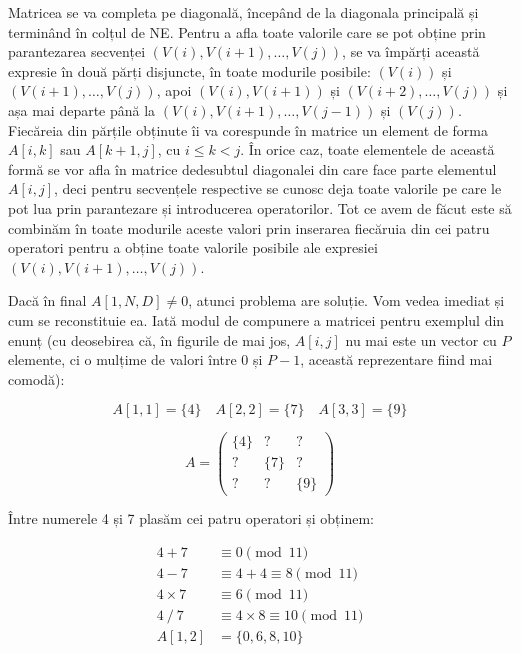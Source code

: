 Matricea se va completa pe diagonală, începând de la diagonala principală și
terminând în colțul de NE. Pentru a afla toate valorile care se pot obține
prin parantezarea secvenței $(V(i), V(i+1), \dots, V(j))$, se va împărți
această expresie în două părți disjuncte, în toate modurile posibile: $(V(i))$
și $(V(i+1), \dots, V(j))$, apoi $(V(i), V(i+1))$ și $(V(i+2), \dots, V(j))$
și așa mai departe până la $(V(i), V(i+1), \dots, V(j-1))$ și
$(V(j))$. Fiecăreia din părțile obținute îi va corespunde în matrice un
element de forma $A[i,k]$ sau $A[k+1,j]$, cu $i \leq k < j$. În orice caz,
toate elementele de această formă se vor afla în matrice dedesubtul diagonalei
din care face parte elementul $A[i,j]$, deci pentru secvențele respective se
cunosc deja toate valorile pe care le pot lua prin parantezare și introducerea
operatorilor. Tot ce avem de făcut este să combinăm în toate modurile aceste
valori prin inserarea fiecăruia din cei patru operatori pentru a obține toate
valorile posibile ale expresiei $(V(i), V(i+1), \dots, V(j))$.

Dacă în final $A[1,N,D] \neq 0$, atunci problema are soluție. Vom vedea
imediat și cum se reconstituie ea. Iată modul de compunere a matricei pentru
exemplul din enunț (cu deosebirea că, în figurile de mai jos, $A[i,j]$ nu mai
este un vector cu $P$ elemente, ci o mulțime de valori între 0 și $P-1$,
această reprezentare fiind mai comodă):

\begin{equation}
  A[1,1] = \{4\} \quad A[2,2] = \{7\} \quad A[3,3] = \{9\}
\end{equation}

\begin{equation}
  A =
  \begin{pmatrix}
    \{4\} & ? & ? \\
    ? & \{7\} & ? \\
    ? & ? & \{9\}
  \end{pmatrix}
\end{equation}

Între numerele 4 și 7 plasăm cei patru operatori și obținem:

\begin{align*}
  4 + 7 & \equiv 0 \pmod{11} \\
  4 - 7 & \equiv 4 + 4 \equiv 8 \pmod{11} \\
  4 \times 7 & \equiv 6 \pmod{11} \\
  4\ /\ 7 & \equiv 4 \times 8 \equiv 10 \pmod{11} \\
  A[1,2] & = \{0, 6, 8, 10\}
\end{align*}

